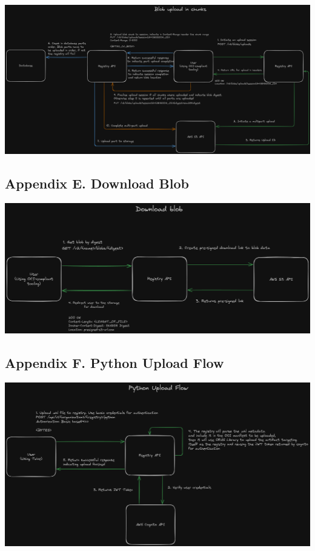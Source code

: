 \documentclass{article}
\begin{document}
  \includegraphics[scale=0.20]{appendix/blob-upload-in-chunks.png}

  \subsection{Appendix E. Download Blob}
  \label{sec:appendix-e}

  \includegraphics[scale=0.25]{appendix/download-blob.png}

  \subsection{Appendix F. Python Upload Flow}
  \label{sec:appendix-f}

  \includegraphics[scale=0.25]{appendix/python-upload-flow.png}
\end{document}
